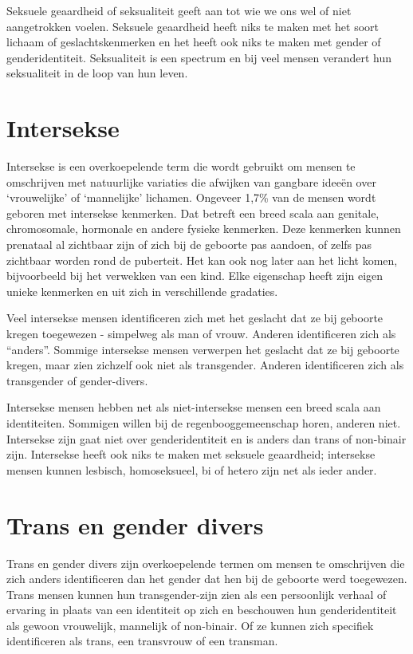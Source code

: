 \documentclass[12pt,openany]{book}
\begin{document}
Seksuele geaardheid of seksualiteit geeft aan tot wie we ons wel of niet aangetrokken voelen. Seksuele geaardheid heeft niks te maken met het soort lichaam of geslachtskenmerken en het heeft ook niks te maken met gender of genderidentiteit. Seksualiteit is een spectrum en bij veel mensen verandert hun seksualiteit in de loop van hun leven.

\section*{Intersekse}

Intersekse is een overkoepelende term die wordt gebruikt om mensen te omschrijven met natuurlijke variaties die afwijken van gangbare ideeën over ‘vrouwelijke’ of ‘mannelijke’ lichamen.  Ongeveer 1,7\% van de mensen wordt geboren met intersekse kenmerken. Dat betreft een breed scala aan genitale, chromosomale, hormonale en andere fysieke kenmerken. Deze kenmerken kunnen prenataal al zichtbaar zijn of zich bij de geboorte pas aandoen, of zelfs pas zichtbaar worden rond de puberteit. Het kan ook nog later aan het licht komen, bijvoorbeeld bij het verwekken van een kind. Elke eigenschap heeft zijn eigen unieke kenmerken en uit zich in verschillende gradaties.  

Veel intersekse mensen identificeren zich met het geslacht dat ze bij geboorte kregen toegewezen - simpelweg als man of vrouw. Anderen identificeren zich als “anders”. Sommige intersekse mensen verwerpen het geslacht dat ze bij geboorte kregen, maar zien zichzelf ook niet als transgender. Anderen identificeren zich als transgender of gender-divers.  

Intersekse mensen hebben net als niet-intersekse mensen een breed scala aan identiteiten. Sommigen willen bij de regenbooggemeenschap horen, anderen niet. Intersekse zijn gaat niet over genderidentiteit en is anders dan trans of non-binair zijn. Intersekse heeft ook niks te maken met seksuele geaardheid; intersekse mensen kunnen lesbisch, homoseksueel, bi of hetero zijn net als ieder ander.   

\section*{Trans en gender divers}

Trans en gender divers zijn overkoepelende termen om mensen te omschrijven die zich anders identificeren dan het gender dat hen bij de geboorte werd toegewezen. Trans mensen kunnen hun transgender-zijn zien als een persoonlijk verhaal of ervaring in plaats van een identiteit op zich en beschouwen hun genderidentiteit als gewoon vrouwelijk, mannelijk of non-binair. Of ze kunnen zich specifiek identificeren als trans, een transvrouw of een transman.
\end{document}
